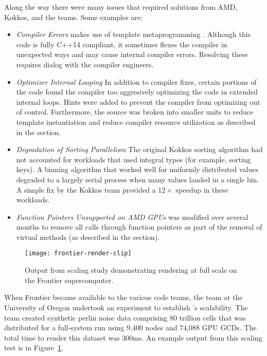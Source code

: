 Along the way there were many issues that required solutions from AMD, Kokkos, and the \vtkm teams. Some examples are:
\begin{itemize}
\item \emph{Compiler Errors}
  \vtkm makes use of template metaprogramming \cite{Meyers2005}.
  Although this code is fully C++14 compliant, it sometimes flexes the compiler in unexpected ways and may cause internal compiler errors.
  Resolving these requires dialog with the compiler engineers.
\item \emph{Optimizer Internal Looping}
  In addition to compiler fixes, certain portions of the code found the compiler too aggresively optimizing the code in extended internal loops.
  Hints were added to prevent the compiler from optimizing out of control.
  Furthermore, the \vtkm source was broken into smaller units to reduce template instantiation and reduce compiler resource utilization as described in the  section.
\item \emph{Degradation of Sorting Parallelism}
  The original Kokkos sorting algorithm had not accounted for \vtkm workloads that used integral types (for example, sorting keys).
  A binning algorithm that worked well for uniformly distributed values degraded to a largely serial process when many values landed in a single bin.
  A simple fix by the Kokkos team provided a $12\times$ speedup in these workloads.
\item \emph{Function Pointers Unsupported on AMD GPUs}
  \vtkm was modified over several months to remove all calls through function pointers as part of the removal of virtual methods (as described in the  section).
\end{itemize}

\begin{figure}[htb]
  \texttt{[image: frontier-render-clip]}
  \caption{
    Output from \vtkm scaling study demonstrating rendering at full scale on the Frontier supercomputer.
  }
  \label{fig:frontier-render}
\end{figure}

When Frontier became available to the various code teams, the \vtkm team at the University of Oregon undertook an experiment to establish \vtkm's scalability.
The team created synthetic perlin noise data comprising 80 trillion cells that was distributed for a full-system run using 9,400 nodes and 74,088 GPU GCDs.
The total time to render this dataset was 300ms.
An example output from this scaling test is in Figure~\ref{fig:frontier-render}.


